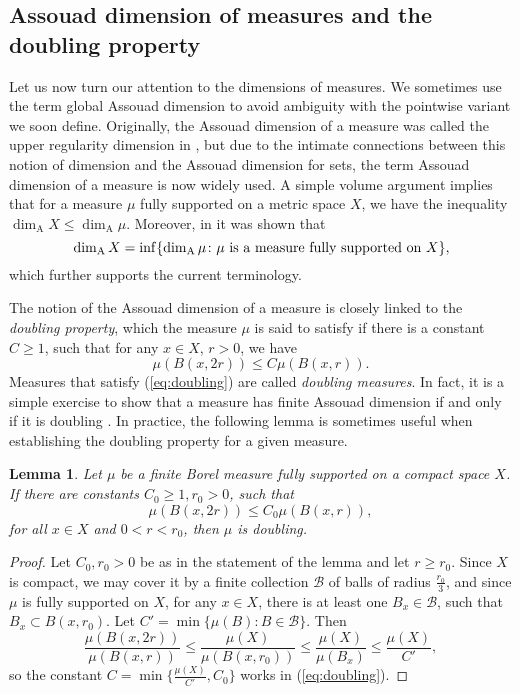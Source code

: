 \documentclass{PRM}
\newcommand{\adim}{\dim_{\mathrm{A}}}
\theoremstyle{plain}
\newtheorem{lemma}[thm]{Lemma}
\theoremstyle{definition}
\theoremstyle{remark}
\begin{document}
\subsection{Assouad dimension of measures and the doubling property}
Let us now turn our attention to the dimensions of measures. We sometimes use the term global Assouad dimension to avoid ambiguity with the pointwise variant we soon define.
Originally, the Assouad dimension of a measure was called the upper regularity dimension in \cite{KLV}, but due to the intimate connections between this notion of dimension and the Assouad dimension for sets, the term Assouad dimension of a measure is now widely used. A simple volume argument implies that for a measure $\mu$ fully supported on a metric space $X$, we have the inequality $\adim X\leq \adim\mu$. Moreover, in \cite{VK, LS} it was shown that
\begin{equation*}
    \adim X=\inf\{\adim\mu\colon \mu\textnormal{ is a measure fully supported on }X\},
\end{equation*}
which further supports the current terminology.

The notion of the Assouad dimension of a measure is closely linked to the \emph{doubling property}, which the measure $\mu$ is said to satisfy if there is a constant $C\geq 1$, such that for any $x\in X$, $r>0$, we have
\begin{equation}\label{eq:doubling}
    \mu(B(x,2r))\leq C\mu(B(x,r)).
\end{equation}
Measures that satisfy (\ref{eq:doubling}) are called \emph{doubling measures}. In fact, it is a simple exercise to show that a measure has finite Assouad dimension if and only if it is doubling \cite[Lemma 4.1.1]{F}. In practice, the following lemma is sometimes useful when establishing the doubling property for a given measure.

\begin{lemma}\label{lemma:doubling_small_r}
Let $\mu$ be a finite Borel measure fully supported on a compact space $X$. If there are constants $C_0\geq 1,r_0>0$, such that
\begin{equation*}
    \mu(B(x,2r))\leq C_0\mu(B(x,r)),
\end{equation*}
for all $x\in X$ and $0<r<r_0$, then $\mu$ is doubling.
\end{lemma}
\begin{proof}
Let $C_0,r_0>0$ be as in the statement of the lemma and let $r\geq r_0$. Since $X$ is compact, we may cover it by a finite collection $\mathcal{B}$ of balls of radius $\frac{r_0}{3}$, and since $\mu$ is fully supported on $X$, for any $x\in X$, there is at least one $B_x\in\mathcal{B}$, such that $B_x\subset B(x,r_0)$. Let $C'=\min\{\mu(B)\colon B\in\mathcal{B}\}$. Then
\begin{equation*}
    \frac{\mu(B(x,2r))}{\mu(B(x,r))}\leq\frac{\mu(X)}{\mu(B(x,r_0))}\leq \frac{\mu(X)}{\mu(B_x)}\leq \frac{\mu(X)}{C'},
\end{equation*}
so the constant $C=\min\{\frac{\mu(X)}{C'},C_0\}$ works in (\ref{eq:doubling}).
\end{proof}
\end{document}
